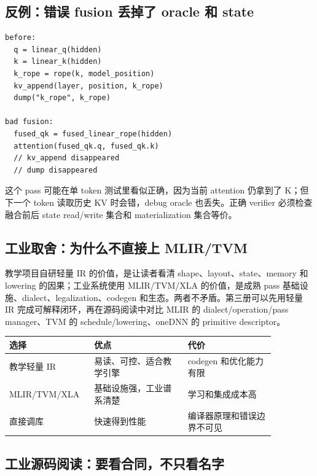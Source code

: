 \subsection{反例：错误 fusion 丢掉了 oracle 和 state}

\begin{lstlisting}[numbers=none,caption={错误 pass 的事故形状}]
before:
  q = linear_q(hidden)
  k = linear_k(hidden)
  k_rope = rope(k, model_position)
  kv_append(layer, position, k_rope)
  dump("k_rope", k_rope)

bad fusion:
  fused_qk = fused_linear_rope(hidden)
  attention(fused_qk.q, fused_qk.k)
  // kv_append disappeared
  // dump disappeared
\end{lstlisting}

这个 pass 可能在单 token 测试里看似正确，因为当前 attention 仍拿到了 K；但下一个 token 读取历史 KV 时会错，debug oracle 也丢失。正确 verifier 必须检查融合前后 state read/write 集合和 materialization 集合等价。

\subsection{工业取舍：为什么不直接上 MLIR/TVM}

教学项目自研轻量 IR 的价值，是让读者看清 shape、layout、state、memory 和 lowering 的因果；工业系统使用 MLIR/TVM/XLA 的价值，是成熟 pass 基础设施、dialect、legalization、codegen 和生态。两者不矛盾。第三册可以先用轻量 IR 完成可解释闭环，再在源码阅读中对比 MLIR 的 dialect/operation/pass manager、TVM 的 schedule/lowering、oneDNN 的 primitive descriptor。

\begin{center}
\begin{tabular}{p{0.24\linewidth}p{0.32\linewidth}p{0.30\linewidth}}
\toprule
选择 & 优点 & 代价 \\
\midrule
教学轻量 IR & 易读、可控、适合教学引擎 & codegen 和优化能力有限 \\
MLIR/TVM/XLA & 基础设施强，工业谱系清楚 & 学习和集成成本高 \\
直接调库 & 快速得到性能 & 编译器原理和错误边界不可见 \\
\bottomrule
\end{tabular}
\end{center}

\subsection{工业源码阅读：要看合同，不只看名字}

